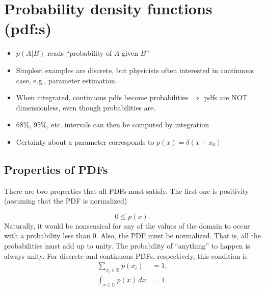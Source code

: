 \documentclass[%
oneside,                 %
final,                   %
10pt]{article}
\newenvironment{block_mdfboxadmon}[1][]{
\begin{block_mdfboxmdframed}[frametitle=#1]
}
{
\end{block_mdfboxmdframed}
}
\begin{document}
\section{Probability density functions (pdf:s)}

\begin{block_mdfboxadmon}[]

\begin{itemize}
 \item $p(A|B)$ reads “probability of $A$ given $B$”

 \item Simplest examples are discrete, but physicists often interested in continuous case, e.g., parameter estimation.

 \item When integrated, continuous pdfs become probabilities $\Rightarrow$ pdfs are NOT dimensionless, even though probabilities are.

 \item 68\%, 95\%, etc. intervals can then be computed by integration 

 \item Certainty about a parameter corresponds to $p(x) = \delta(x-x_0)$
\end{itemize}

\noindent
\end{block_mdfboxadmon} %



\subsection{Properties of PDFs}

\begin{block_mdfboxadmon}[]

There are two properties that all PDFs must satisfy. The first one is
positivity (assuming that the PDF is normalized)

\begin{equation*}
0 \leq p(x).
\end{equation*}
Naturally, it would be nonsensical for any of the values of the domain
to occur with a probability less than $0$. Also,
the PDF must be normalized. That is, all the probabilities must add up
to unity.  The probability of ``anything'' to happen is always unity. For
discrete and continuous PDFs, respectively, this condition is
\begin{align*}
\sum_{x_i\in\mathbb D} p(x_i) & =  1,\\
\int_{x\in\mathbb D} p(x)\,dx & =  1.
\end{align*}
\end{block_mdfboxadmon} %
\end{document}
